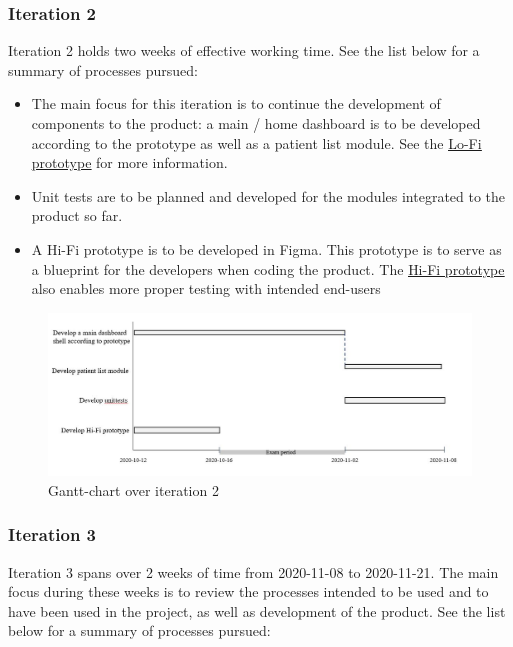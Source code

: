 \subsubsection{Iteration 2}
Iteration 2 holds two weeks of effective working time. See the list below for a summary of processes pursued:

\begin{itemize}
    \item The main focus for this iteration is to continue the development of components to the product: a main / home dashboard is to be developed according to the prototype as well as a patient list module. See the \href{https://gitlab.liu.se/tddc88-company-3-2020/deploy/-/tree/Document_branch/}{\underline{Lo-Fi prototype}} for more information.
    \item Unit tests are to be planned and developed for the modules integrated to the product so far.
    \item A Hi-Fi prototype is to be developed in Figma. This prototype is to serve as a blueprint for the developers when coding the product. The \href{https://gitlab.liu.se/tddc88-company-3-2020/deploy/-/tree/Document_branch/}{\underline{Hi-Fi prototype}} also enables more proper testing with intended end-users
\end{itemize} 

\begin{figure}[H]
\centering
\includegraphics[width=\linewidth]{Pictures/iteration_2.JPG}
\caption{Gantt-chart over iteration 2}
\label{fig:iteration_2}
\end{figure}

\subsubsection{Iteration 3}

Iteration 3 spans over 2 weeks of time from 2020-11-08 to 2020-11-21. The main focus during these weeks is to review the processes intended to be used and to have been used in the project, as well as development of the product. See the list below for a summary of processes pursued:

